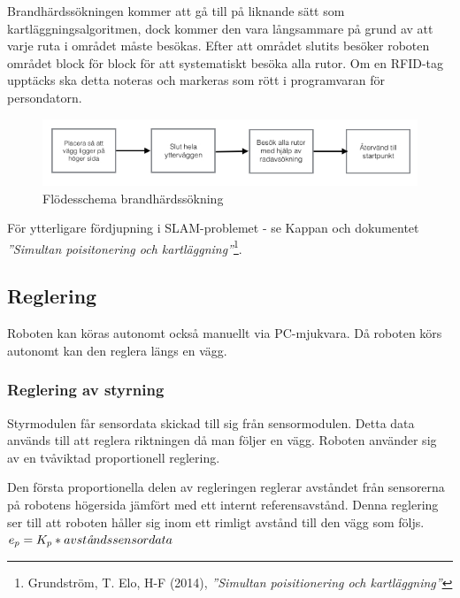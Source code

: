 \documentclass[a4paper,12pt,fleqn]{article}
\begin{document}
Brandhärdssökningen kommer att gå till på liknande sätt som kartläggningsalgoritmen, dock kommer den vara långsammare på grund av att varje ruta i området måste besökas. Efter att området slutits besöker roboten området block för block för att systematiskt besöka alla rutor. Om en RFID-tag upptäcks ska detta noteras och markeras som rött i programvaran för persondatorn.

\begin{figure}[htp] %
  \begin{center}
  \includegraphics[keepaspectratio=true,width=0.5\linewidth]{bilder/flode_brandhard.jpg}  %
  \end{center}
  \caption{Flödesschema brandhärdssökning} %
  \label{fig:fire} %
\end{figure}

För ytterligare fördjupning i SLAM-problemet - se Kappan och dokumentet \textit{''Simultan poisitonering och kartläggning''}\footnote{Grundström, T. Elo, H-F (2014), \textit{''Simultan poisitionering och kartläggning''}}.


\subsection{Reglering}

Roboten kan köras autonomt också manuellt via PC-mjukvara. Då roboten körs autonomt kan den reglera längs en vägg. 

\subsubsection{Reglering av styrning}
Styrmodulen får sensordata skickad till sig från sensormodulen. Detta data används till att reglera riktningen då man följer en vägg. Roboten använder sig av en tvåviktad proportionell reglering. 

Den första proportionella delen av regleringen reglerar avståndet från sensorerna på robotens högersida jämfört med ett internt referensavstånd. Denna reglering ser till att roboten håller sig inom ett rimligt avstånd till den vägg som följs.
$ e_p = K_{p}*avst\text{\it{å}}ndssensordata $
\end{document}

